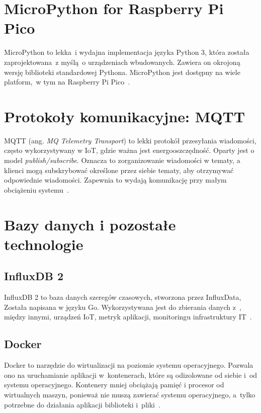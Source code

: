 \section{MicroPython for Raspberry Pi Pico}
MicroPython to lekka~i wydajna implementacja języka Python 3, która została zaprojektowana~z myślą~o urządzeniach wbudowanych.
Zawiera on okrojoną wersję biblioteki standardowej Pythona.
MicroPython jest dostępny na wiele platform,~w tym na Raspberry Pi Pico~\cite{PICO:micropython}.

\section{Protokoły komunikacyjne: MQTT}

MQTT (ang. \emph{MQ Telemetry Transport}) to lekki protokół przesyłania wiadomości, często wykorzystywany w IoT, gdzie ważna jest energooszczędność.
Oparty jest o model \emph{publish/subscribe}.
Oznacza to zorganizowanie wiadomości w tematy, a klienci mogą subskrybować określone przez siebie tematy, aby otrzymywać odpowiednie wiadomości.
Zapewnia to wydają komunikację przy małym obciążeniu systemu~\cite{protocol:mqtt}.

\section{Bazy danych i pozostałe technologie}
\subsection{InfluxDB 2}
InfluxDB 2 to baza danych szeregów czasowych, stworzona przez InfluxData, Została napisana w języku Go.
Wykorzystywana jest do zbierania danych z~, między innymi, urządzeń IoT, metryk aplikacji, monitoringu infrastruktury IT~\cite{tool:influxdb}.

\subsection{Docker}
Docker to narzędzie do wirtualizacji na poziomie systemu operacyjnego.
Pozwala ono na uruchamianie aplikacji w~kontenerach, które są odizolowane od siebie i~od systemu operacyjnego.
Kontenery mniej obciążają pamięć i procesor od wirtualnych maszyn, ponieważ nie muszą zawierać systemu operacyjnego, a~tylko potrzebne do działania aplikacji biblioteki i~pliki~\cite{tool:docker}.

